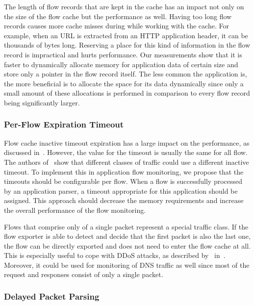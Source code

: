 The length of flow records that are kept in the cache has an impact not only on the size of the flow cache but the performance as well. Having too long flow records causes more cache misses during while working with the cache. For example, when an URL is extracted from an HTTP application header, it can be thousands of bytes long. Reserving a place for this kind of information in the flow record is impractical and hurts performance. Our measurements show that it is faster to dynamically allocate memory for application data of certain size and store only a pointer in the flow record itself. The less common the application is, the more beneficial is to allocate the space for its data dynamically since only a small amount of these allocations is performed in comparison to every flow record being significantly larger.

\subsubsection{Per-Flow Expiration Timeout}

Flow cache inactive timeout expiration has a large impact on the performance, as discussed in~\cite{Rodriguez-2013-Empirical, Molina-2006-Design}. However, the value for the timeout is usually the same for all flow. The authors of~\cite{Rodriguez-2013-Empirical} show that different classes of traffic could use a different inactive timeout. To implement this in application flow monitoring, we propose that the timeouts should be configurable per flow. When a flow is successfully processed by an application parser, a timeout appropriate for this application should be assigned. This approach should decrease the memory requirements and increase the overall performance of the flow monitoring.

Flows that comprise only of a single packet represent a special traffic class. If the flow exporter is able to detect and decide that the first packet is also the last one, the flow can be directly exported and does not need to enter the flow cache at all. This is especially useful to cope with DDoS attacks, as described by~\citeauthor{Sadre-2012-Effects} in~\cite{Sadre-2012-Effects}. Moreover, it could be used for monitoring of DNS traffic as well since most of the request and responses consist of only a single packet.

\subsubsection{Delayed Packet Parsing}

